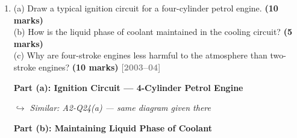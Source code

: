 \documentclass[12pt,a3paper]{article}
\newcommand{\yr}[1]{\hfill\textcolor{gray}{\small\textbf{[#1]}}}
\newcommand{\mk}[1]{\textcolor{orange!70!black}{\small\textbf{(#1 marks)}}}
\newcommand{\variant}[1]{\par\vspace{1pt}\textcolor{blue!50!black}%
  {\footnotesize\textit{$\hookrightarrow$ Similar: #1}}}
\begin{document}
\begin{enumerate}
\begin{tcolorbox}[enhanced,breakable,ansbox,colback=cB!4,colframe=cB,
  boxrule=0.8pt,arc=5pt,
  title={\textbf{Answer}},fonttitle=\bfseries\color{white},colbacktitle=cB]
\hrulefill

\textbf{Part (c): Liquid Cooling System and Thermostat}

\variant{A2-Q23(b) — same diagram given there}

\textbf{Purpose of the thermostat:}
The thermostat is a temperature-sensitive valve located between the engine and
radiator. Its functions are:
\begin{itemize}[leftmargin=1.5em,itemsep=2pt]
  \item \textbf{Rapid warm-up:} When the engine is cold, the thermostat remains
        \emph{closed}, bypassing the radiator. Coolant recirculates only within
        the engine, allowing it to reach operating temperature quickly
        ($\approx$80--95\textdegree C).
  \item \textbf{Temperature regulation:} Once the coolant reaches the thermostat
        opening temperature, it opens and allows coolant to flow through the
        radiator for cooling.
  \item \textbf{Efficiency:} Keeping the engine at the optimal operating
        temperature improves fuel combustion efficiency, reduces wear, and
        minimises emissions. A cold engine has higher friction and incomplete
        combustion.
\end{itemize}

\end{tcolorbox}

\item \label{qlabel:A2-Q28}
(a) Draw a typical ignition circuit for a four-cylinder petrol engine. \mk{10}\\
(b) How is the liquid phase of coolant maintained in the cooling circuit? \mk{5}\\
(c) Why are four-stroke engines less harmful to the atmosphere than two-stroke engines? \mk{10}
\yr{2003--04}

\begin{tcolorbox}[enhanced,breakable,ansbox,colback=cB!4,colframe=cB,
  boxrule=0.8pt,arc=5pt,
  title={\textbf{Answer}},fonttitle=\bfseries\color{white},colbacktitle=cB]

\textbf{Part (a): Ignition Circuit — 4-Cylinder Petrol Engine}

\variant{A2-Q24(a) — same diagram given there}

\hrulefill

\textbf{Part (b): Maintaining Liquid Phase of Coolant}


\end{tcolorbox}
\end{enumerate}
\end{document}
